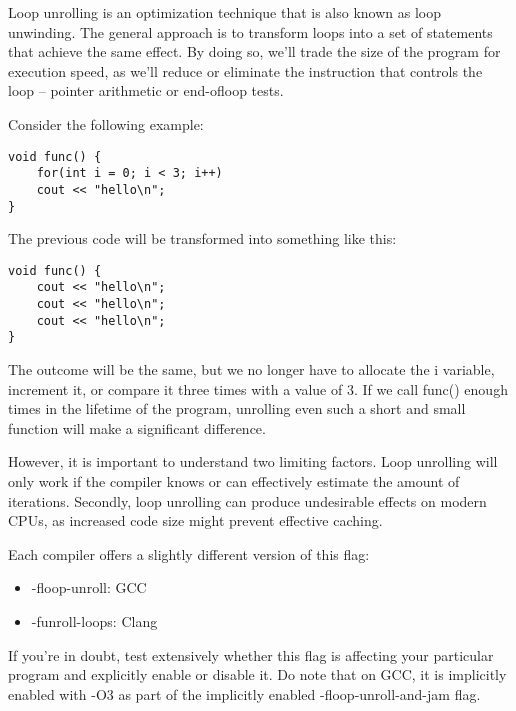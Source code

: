 
Loop unrolling is an optimization technique that is also known as loop unwinding. The general approach is to transform loops into a set of statements that achieve the same effect. By doing so, we'll trade the size of the program for execution speed, as we'll reduce or eliminate the instruction that controls the loop – pointer arithmetic or end-ofloop tests.

Consider the following example:

\begin{lstlisting}[style=styleCXX]
void func() {
	for(int i = 0; i < 3; i++)
	cout << "hello\n";
}
\end{lstlisting}

The previous code will be transformed into something like this:

\begin{lstlisting}[style=styleCXX]
void func() {
	cout << "hello\n";
	cout << "hello\n";
	cout << "hello\n";
}
\end{lstlisting}

The outcome will be the same, but we no longer have to allocate the i variable, increment it, or compare it three times with a value of 3. If we call func() enough times in the lifetime of the program, unrolling even such a short and small function will make a significant difference.

However, it is important to understand two limiting factors. Loop unrolling will only work if the compiler knows or can effectively estimate the amount of iterations. Secondly, loop unrolling can produce undesirable effects on modern CPUs, as increased code size might prevent effective caching.

Each compiler offers a slightly different version of this flag:

\begin{itemize}
\item 
-floop-unroll: GCC

\item 
-funroll-loops: Clang
\end{itemize}

If you're in doubt, test extensively whether this flag is affecting your particular program and explicitly enable or disable it. Do note that on GCC, it is implicitly enabled with -O3 as part of the implicitly enabled -floop-unroll-and-jam flag.


